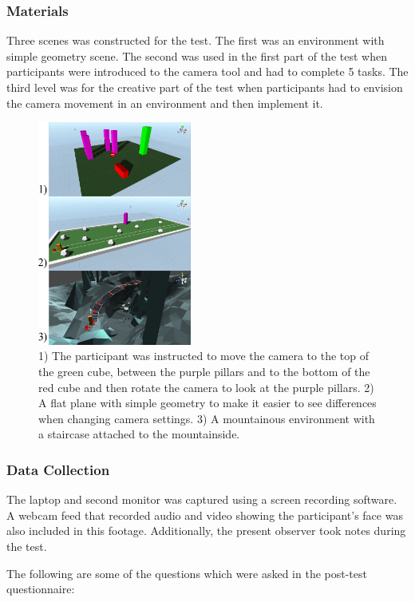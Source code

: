 \subsubsection{Materials}
Three scenes was constructed for the test. The first was an environment with simple geometry scene. The second was used in the first part of the test when participants were introduced to the camera tool and had to complete 5 tasks. The third level was for the creative part of the test when participants had to envision the camera movement in an environment and then implement it. 

\begin{figure}[htbp]
\centering
\includegraphics[width=0.45\textwidth]{Pics/sceneAll}
\caption{1) The participant was instructed to move the camera to the top of the green cube, between the purple pillars and to the bottom of the red cube and then rotate the camera to look at the purple pillars. 2) A flat plane with simple geometry to make it easier to see differences when changing camera settings. 3) A mountainous environment with a staircase attached to the mountainside.}
\label{fig:sceneAll}
\end{figure}

\subsubsection{Data Collection}
The laptop and second monitor was captured using a screen recording software. A webcam feed  that recorded audio and video showing the participant's face was also included in this footage. Additionally, the present observer took notes during the test.

The following are some of the questions which were asked in the post-test questionnaire:

